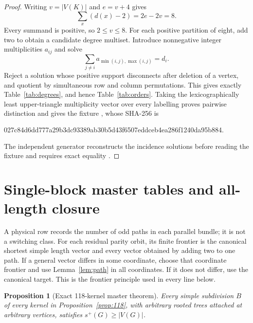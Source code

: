 \documentclass[11pt]{article}
\newtheorem{proposition}[theorem]{Proposition}
\theoremstyle{remark}
\newcommand{\spn}{s^+}
\begin{document}
\begin{proof}
Writing $v=|V(K)|$ and $e=v+4$ gives
\[
 \sum_x(d(x)-2)=2e-2v=8.
\]
Every summand is positive, so $2\le v\le8$.  For each positive partition of
eight, add two to obtain a candidate degree multiset.  Introduce nonnegative
integer multiplicities $a_{ij}$ and solve
\[
 \sum_{j\ne i}a_{\min(i,j),\max(i,j)}=d_i.
\]
Reject a solution whose positive support disconnects after deletion of a
vertex, and quotient by simultaneous row and column permutations.  This gives
exactly Table~\ref{tab:degrees}, and hence Table~\ref{tab:orders}.  Taking the
lexicographically least upper-triangle multiplicity vector over every labelling
proves pairwise distinction and gives the fixture
, whose SHA-256 is
\begin{center}\ttfamily\small
027c84d6dd777a29b3dc93389ab30b5d43f6507eddceb4ea286f1240da95b884.
\end{center}
The independent generator reconstructs the incidence solutions before reading
the fixture and requires exact equality \cite{KernelClassification}.
\end{proof}

\section{Single-block master tables and all-length closure}

A physical row records the number of odd paths in each parallel bundle; it is
not a switching class.  For each residual parity orbit, its finite frontier is
the canonical shortest simple length vector and every vector obtained by adding
two to one path.  If a general vector differs in some coordinate, choose that
coordinate frontier and use Lemma~\ref{lem:path} in all coordinates.  If it
does not differ, use the canonical target.  This is the frontier principle used
in every line below.

\begin{proposition}[Exact 118-kernel master theorem]\label{prop:master}
Every simple subdivision $B$ of every kernel in Proposition~\ref{prop:118},
with arbitrary rooted trees attached at arbitrary vertices, satisfies
$\spn(G)\ge|V(G)|$.
\end{proposition}
\end{document}
